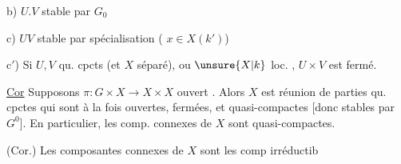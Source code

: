 b) $U.V$ stable par $G_0$ 

c) $UV$ stable par spécialisation  (   $x\in X(k')$) 

c$'$) Si $U,V$ qu. cpcts (et $X$  séparé), ou $\unsure{X|k}$ loc. , $U\times V$ est fermé.

\uline{Cor} Supposons  $\pi:G\times X\longrightarrow X\times X$ ouvert . Alors $X$ est réunion de parties qu. cpctes  qui sont à la fois ouvertes, fermées, et quasi-compactes [donc stables par $G^0$]. En particulier, les comp. connexes de $X$ sont quasi-compactes.

(Cor.) Les composantes connexes de $X$ sont les comp irréductib

